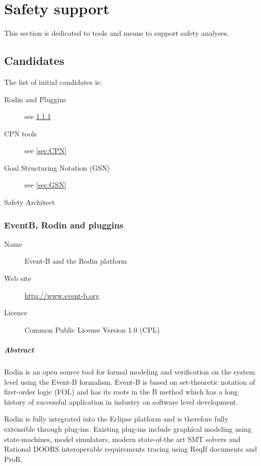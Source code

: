 

\chapter{Safety support}
\label{sec:safety}

This section is dedicated to tools and means to support safety analyses.


\section{Candidates}



The list of initial candidates is:

\begin{description}
\item [Rodin and Pluggins] see \ref{sec:eventb_safe}
\item [CPN tools] see \ref{sec:CPN}
\item [Goal Structuring Notation (GSN)] see \ref{sec:GSN}
\item [Safety Architect]
\end{description}

\subsection{EventB, Rodin and pluggins}
\label{sec:eventb_safe}

\begin{description}
\item[Name] Event-B and the Rodin platform
\item[Web site] \url{http://www.event-b.org}
\item[Licence] Common Public License Version 1.0 (CPL)
\end{description}

\paragraph{Abstract}

Rodin is an open source tool for formal modeling and verification on the system
level using the Event-B formalism. Event-B is based on set-theoretic notation of
first-order logic (FOL) and has its roots in the B method which has a long
history of successful application in industry on software level development.

Rodin is fully integrated into the Eclipse platform and is therefore fully
extensible through plug-ins. Existing plug-ins include graphical modeling using
state-machines, model simulators, modern state-of-the art SMT solvers and
Rational DOORS interoperable requirements tracing using ReqIf documents and
ProR.

